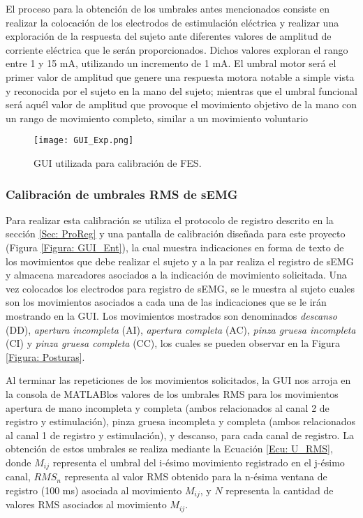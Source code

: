 El proceso para la obtención de los umbrales antes mencionados consiste en realizar la colocación de los electrodos de estimulación eléctrica y realizar una exploración de la respuesta del sujeto ante diferentes valores de amplitud de corriente eléctrica que le serán proporcionados. Dichos valores exploran el rango entre 1 y 15 mA, utilizando un incremento de 1 mA. El umbral motor será el primer valor de amplitud que genere una respuesta motora notable a simple vista y reconocida por el sujeto en la mano del sujeto; mientras que el umbral funcional será aquél valor de amplitud que provoque el movimiento objetivo de la mano con un rango de movimiento completo, similar a un movimiento voluntario

\begin{figure}[htb]
	\centering
	\texttt{[image: GUI\_Exp.png]}
	\caption{GUI utilizada para calibración de FES.}
	\label{Figura: GUI_Exp}
\end{figure}

\subsubsection{Calibración de umbrales RMS de sEMG}
Para realizar esta calibración se utiliza el protocolo de registro descrito en la sección \ref{Sec: ProReg} y una pantalla de calibración diseñada para este proyecto (Figura \ref{Figura: GUI_Ent}), la cual muestra indicaciones en forma de texto de los movimientos que debe realizar el sujeto y a la par realiza el registro de sEMG y almacena marcadores asociados a la indicación de movimiento solicitada. Una vez colocados los electrodos para registro de sEMG, se le muestra al sujeto cuales son los movimientos asociados a cada una de las indicaciones que se le irán mostrando en la GUI. Los movimientos mostrados son denominados \emph{descanso} (DD), \emph{apertura incompleta} (AI), \emph{apertura completa} (AC), \emph{pinza gruesa incompleta} (CI) y \emph{pinza gruesa completa} (CC), los cuales se pueden observar en la Figura \ref{Figura: Posturas}.

Al terminar las repeticiones de los movimientos solicitados, la GUI nos arroja en la consola de MATLAB\textregistered los valores de los umbrales RMS para los movimientos apertura de mano incompleta y completa (ambos relacionados al canal 2 de registro y estimulación), pinza gruesa incompleta y completa (ambos relacionados al canal 1 de registro y estimulación), y descanso, para cada canal de registro. La obtención de estos umbrales se realiza mediante la Ecuación \ref{Ecu: U_RMS}, donde $M_{ij}$ representa el umbral del i-ésimo movimiento registrado en el j-ésimo canal, $RMS_n$ representa al valor RMS obtenido para la n-ésima ventana de registro (100 ms) asociada al movimiento $M_{ij}$, y $N$ representa la cantidad de valores RMS asociados al movimiento $M_{ij}$.

